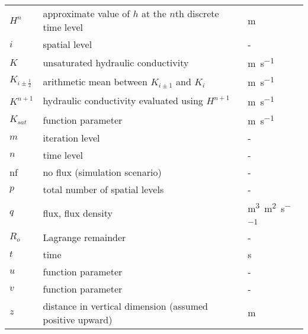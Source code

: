 {\begin{longtabu}{l L l}
    $H^n$ & approximate value of $h$ at the $n$th discrete time level & \si{\metre} \\
    $i$ & spatial level & - \\
    $K$ & unsaturated hydraulic conductivity & \si{\metre\per\second} \\
    $K_{i\pm\frac{1}{2}}$ & arithmetic mean between $K_{i\pm1}$ and $K_i$ & \si{\metre\per\second} \\
    $K^{n+1}$ & hydraulic conductivity evaluated using $H^{n+1}$ & \si{\metre\per\second} \\
    $K_{sat}$ & function parameter & \si{\metre\per\second} \\
    $m$ & iteration level & - \\
    $n$ & time level & - \\
    nf & no flux (simulation scenario) & - \\
    $p$ & total number of spatial levels & - \\
    $q$ & flux, flux density & \si{\cubic\metre\per\square\metre\per\second}\\
    $R_o$ & Lagrange remainder & - \\
    $t$ & time & \si{\second} \\
    $u$ & function parameter & - \\
    $v$ & function parameter & - \\
    $z$ & distance in vertical dimension (assumed positive upward) & \si{\metre} \\
  \end{longtabu}
  
}
